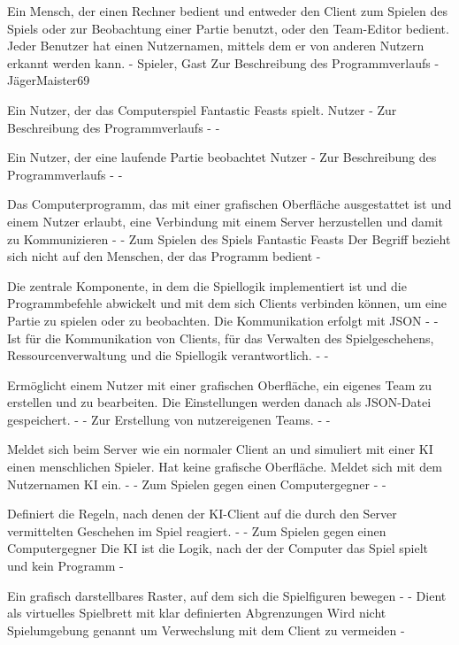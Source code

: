 {Ein Mensch, der einen Rechner bedient und entweder den Client zum Spielen des Spiels oder zur Beobachtung einer Partie benutzt, oder den Team-Editor bedient. Jeder Benutzer hat einen Nutzernamen, mittels dem er von anderen Nutzern erkannt werden kann.}
{-}
{Spieler, Gast}
{Zur Beschreibung des Programmverlaufs}
{-}
{JägerMaister69}

{Ein Nutzer, der das Computerspiel \glqq{}Fantastic Feasts\grqq{}  spielt.}
{Nutzer}
{-}
{Zur Beschreibung des Programmverlaufs}
{-}
{-}

{Ein Nutzer, der eine laufende Partie beobachtet}
{Nutzer}
{-}
{Zur Beschreibung des Programmverlaufs}
{-}
{-}

{Das Computerprogramm, das mit einer grafischen Oberfläche ausgestattet ist und einem Nutzer erlaubt, eine Verbindung mit einem Server herzustellen und damit zu Kommunizieren}
{-}
{-}
{Zum Spielen des Spiels \glqq{}Fantastic Feasts\grqq{} }
{Der Begriff bezieht sich nicht auf den Menschen, der das Programm bedient}
{-}

{Die zentrale Komponente, in dem die Spiellogik implementiert ist und die Programmbefehle abwickelt und mit dem sich Clients verbinden können, um eine Partie zu spielen oder zu beobachten. Die Kommunikation erfolgt mit JSON}
{-}
{-}
{Ist für die Kommunikation von Clients, für das Verwalten des Spielgeschehens, Ressourcenverwaltung und die Spiellogik verantwortlich.}
{-}
{-}

{Ermöglicht einem Nutzer mit einer grafischen Oberfläche, ein eigenes Team zu erstellen und zu bearbeiten. Die Einstellungen werden danach als JSON-Datei gespeichert.}
{-}
{-}
{Zur Erstellung von nutzereigenen Teams.}
{-}
{-}

{Meldet sich beim Server wie ein normaler Client an und simuliert mit einer KI einen menschlichen Spieler. Hat keine grafische Oberfläche. Meldet sich mit dem Nutzernamen \glqq{}KI\grqq{}  ein.}
{-}
{-}
{Zum Spielen gegen einen Computergegner}
{-}
{-}

{Definiert die Regeln, nach denen der KI-Client auf die durch den Server vermittelten Geschehen im Spiel reagiert.}
{-}
{-}
{Zum Spielen gegen einen Computergegner}
{Die KI ist die Logik, nach der der Computer das Spiel spielt und kein Programm}
{-}

{Ein grafisch darstellbares Raster, auf dem sich die Spielfiguren bewegen}
{-}
{-}
{Dient als virtuelles Spielbrett mit klar definierten Abgrenzungen}
{Wird nicht Spielumgebung genannt um Verwechslung mit dem Client zu vermeiden}
{-}

